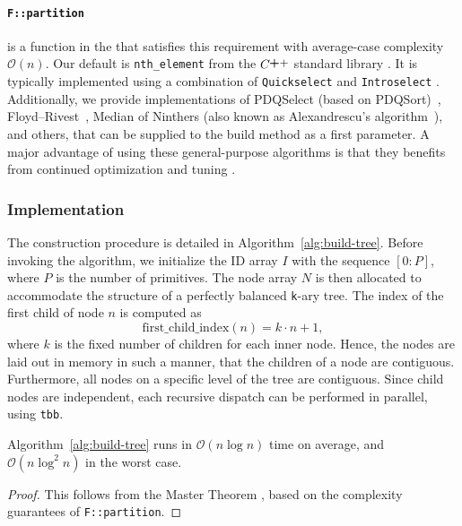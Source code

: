 \paragraph*{\texttt{F::partition}} is a function in the
that satisfies this requirement
with average-case complexity $\mathcal{O}(n)$. Our default is
\texttt{nth\_element} from the
$\cpp$ standard library \cite{nth-element}.
It is typically implemented using a
combination of \texttt{Quickselect} \cite{quickselect0} and
\texttt{Introselect} \cite{introselect0}.
Additionally, we provide implementations of
PDQSelect (based on PDQSort)~\cite{pdqSort},
Floyd–Rivest~\cite{floyd1975expected},
Median of Ninthers (also known as Alexandrescu’s
        algorithm~\cite{alexandrescu-sorting}),
and others, that can be supplied to the 
build method as a first parameter.
A major advantage
of using these general-purpose algorithms is that
they benefits
from continued optimization and tuning
\cite{quickselect1, introselect1, selection}.

\subsubsection{Implementation}

The construction procedure is detailed in
Algorithm~\ref{alg:build-tree}. Before invoking the
algorithm, we initialize the ID array $I$ with the sequence
$[0 : P]$, where $P$ is the number of primitives. The node
array $N$ is then allocated to accommodate the structure of
a perfectly balanced \texttt{k}-ary tree. The index of the
first child of node $n$ is computed as
\[
	\mathrm{first\_child\_index}(n) = k \cdot n + 1,
\]
where $k$ is the fixed number of children for each
inner node. Hence, the nodes are laid out in memory
in such a manner, that the children of a node are
contiguous. Furthermore, all nodes on a specific level
of the tree are contiguous.
Since child nodes are independent, each
recursive dispatch can be performed in parallel,
using \texttt{tbb}\cite{tbb}.

\begin{theorem}
	Algorithm~\ref{alg:build-tree} runs in
	$\mathcal{O}(n \log n)$ time on average, and
	$\mathcal{O}(n \log^2 n)$ in the worst case.
\end{theorem}

\begin{proof}
	This follows from the Master Theorem
	\cite{master-theorem}, based on the complexity guarantees
	of \texttt{F::partition}.
\end{proof}

